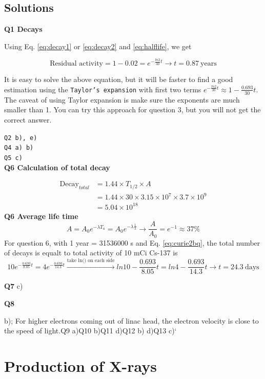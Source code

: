 \documentclass[]{book}
\theoremstyle{definition}
\theoremstyle{definition}
\theoremstyle{definition}
\theoremstyle{remark}
\begin{document}
\section{Solutions}\label{nucl-solution}

\textbf{Q1 Decays}

Using Eq. \eqref{eq:decay1} or \eqref{eq:decay2} and \eqref{eq:halflife}, we
get

\[
\text{Residual activity} = 1-0.02 = e^{-\frac{ln2}{30}t} \rightarrow \boxed{t =0.87\ \text{years}}
\]

It is easy to solve the above equation, but it will be faster to find a
good estimation using the \texttt{Taylor’s\ expansion} with first two
terms \(e^{-\frac{ln2}{30}t} \approx 1-\frac{0.693}{30}t\). The caveat
of using Taylor expansion is make sure the exponents are much smaller
than 1. You can try this approach for question 3, but you will not get
the correct answer.

\texttt{Q2\ b),\ e)}\\
\texttt{Q4\ a)\ b)}\\
\texttt{Q5\ c)}\\
\textbf{Q6 Calculation of total decay}

\[
\begin{aligned}
\text{Decay}_{total} &= 1.44 \times T_{1/2} \times {A} \\
    &= 1.44 \times 30 \times 3.15\times 10^7 \times 3.7\times 10^9 \\
    &= \boxed{5.04\times 10^{18}}
\end{aligned}
\] \textbf{Q6 Average life time} \[
A=A_0e^{-\lambda T_a}=A_0e^{-\lambda \frac{1}{\lambda}}\rightarrow \frac{A}{A_0}=e^{-1} \approx \boxed{37\%}
\] For question 6, with 1 year = 31536000 s and Eq. \eqref{eq:curie2bq},
the total number of decays is equalt to total activity of 10 mCi Cs-137
is \[
10e^{-\frac{0.693}{8.05}t} = 4e^{-\frac{0.693}{14.3}t} \xrightarrow{\text{take ln() on each side}}
  ln10-\frac{0.693}{8.05}t = ln4 -\frac{0.693}{14.3}t \rightarrow t = \boxed{24.3\ \text{days}}
\]

\textbf{Q7} c)

\textbf{Q8}

b); For higher electrons coming out of linac head, the electron velocity
is close to the speed of light.\texttt{}Q9 a)\texttt{}Q10 b)\texttt{}Q11
d)\texttt{}Q12 b) d)\texttt{}Q13 c)`

\chapter{Production of X-rays}\label{prox}
\end{document}
